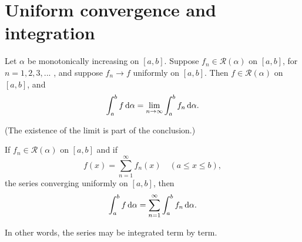 \section{Uniform convergence and integration}
\begin{thm}
    \label{thm:7.16}
    Let $\alpha$ be monotonically increasing on $[a, b]$. 
    Suppose $f_n \in \mathscr{R}(\alpha)$ on $[a, b]$, 
    for $n = 1, 2, 3, ...$ , 
    and suppose $f_n \rightarrow f$ uniformly on $[a, b]$. 
    Then $f \in \mathscr{R}(\alpha)$ on $[a, b]$, and
    \begin{equation}
        \label{eq:7.23}
        \int_{a}^{b} f \d \alpha = 
        \lim_{n \to \infty} \int_{a}^{b} f_n \d \alpha.
    \end{equation}
\end{thm}

(The existence of the limit is part of the conclusion.)


\begin{myCorollary*}
    If $f_n \in \mathscr{R}(\alpha)$ on $[a, b]$ and if 
    \begin{equation*}
        f(x) = \sum_{n=1}^{\infty} f_n (x)
        \quad
        (a \leq x \leq b),
    \end{equation*}
    the series converging uniformly on $[a, b]$, then
    \begin{equation*}
        \int_{a}^{b} f \d \alpha = 
        \sum_{n=1}^{\infty} \int_{a}^{b} f_n \d \alpha.
    \end{equation*}
\end{myCorollary*}

In other words, the series may be integrated term by term.